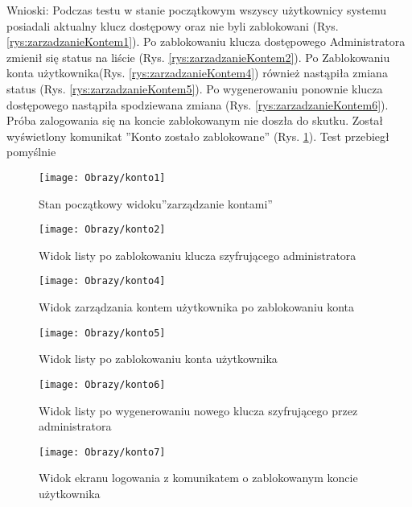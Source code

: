 \begin{enumerate*}
		Wnioski: Podczas testu w stanie początkowym wszyscy użytkownicy systemu posiadali aktualny klucz dostępowy oraz nie byli zablokowani (Rys. \ref{rys:zarzadzanieKontem1}). Po zablokowaniu klucza dostępowego  Administratora zmienił się status na liście (Rys. \ref{rys:zarzadzanieKontem2}). Po Zablokowaniu konta użytkownika(Rys. \ref{rys:zarzadzanieKontem4}) również nastąpiła zmiana  status  (Rys. \ref{rys:zarzadzanieKontem5}). Po wygenerowaniu ponownie klucza dostępowego nastąpiła spodziewana zmiana (Rys. \ref{rys:zarzadzanieKontem6}). Próba zalogowania się na koncie zablokowanym nie doszła do skutku. Został wyświetlony komunikat ''Konto zostało zablokowane'' (Rys. \ref{rys:zarzadzanieKontem7}). Test przebiegł pomyślnie		
		
				\begin{figure}[ht!]
					\begin{minipage}{0.2\textwidth}
						\texttt{[image: Obrazy/konto1]}
						\caption{Stan początkowy widoku''zarządzanie kontami'' }
						\label{rys:zarzadzanieKontem1}
					\end{minipage}
				\begin{minipage}{0.2\textwidth}
					\texttt{[image: Obrazy/konto2]}
					\caption{Widok listy po zablokowaniu klucza szyfrującego administratora }
					\label{rys:zarzadzanieKontem2}
				\end{minipage}
			
		
			
			\begin{minipage}{0.2\textwidth}
				\texttt{[image: Obrazy/konto4]}
				\caption{Widok zarządzania kontem użytkownika po zablokowaniu konta }
				\label{rys:zarzadzanieKontem4}
			\end{minipage}
			
			
			\begin{minipage}{0.2\textwidth}
				\texttt{[image: Obrazy/konto5]}
				\caption{Widok listy po zablokowaniu konta użytkownika}
				\label{rys:zarzadzanieKontem5}
			\end{minipage}
		
		
			\begin{minipage}{0.2\textwidth}
			\texttt{[image: Obrazy/konto6]}
			\caption{Widok listy po wygenerowaniu nowego klucza szyfrującego przez administratora}
			\label{rys:zarzadzanieKontem6}
		\end{minipage}
	
		\begin{minipage}{0.2\textwidth}
		\texttt{[image: Obrazy/konto7]}
		\caption{Widok ekranu logowania z komunikatem o zablokowanym koncie użytkownika}
		\label{rys:zarzadzanieKontem7}
	\end{minipage}


\end{figure}
\end{enumerate*}
